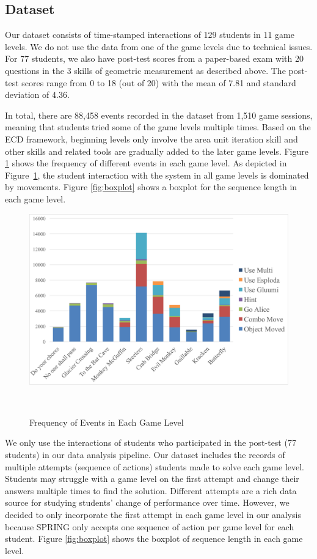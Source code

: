 \documentclass{sigchi}
\def\algname{SPRING\xspace}
\begin{document}
	\subsection{Dataset} 
	Our dataset consists of time-stamped interactions of 129 students in 11 game levels. 
	We do not use the data from one of the game levels due to technical issues.
	For 77 students, we also have post-test scores from a paper-based exam with 20 questions in the 3 skills of geometric measurement as described above.
	The post-test scores range from 0 to 18 (out of 20) with the mean of 7.81 and standard deviation of 4.36. 

	In total, there are 88,458 events recorded in the dataset from 1,510 game sessions, meaning that students tried some of the game levels  multiple times.
	Based on the ECD framework, beginning levels only involve the area unit iteration skill and other skills and related tools are gradually added to the later game levels.
	Figure \ref{fig:frequency} shows the frequency of different events in each game level. 
	As depicted in Figure~\ref{fig:frequency}, the student interaction with the system in all game levels is dominated by movements.
	Figure \ref{fig:boxplot} shows a boxplot for the sequence length in each game level. 

	
	\begin{figure}
		\centering
		\includegraphics[width=0.9\columnwidth]{figures/frequency.pdf}
		\caption{Frequency of Events in Each Game Level}~\label{fig:frequency}
	\end{figure}	
	

	We only use the interactions of students who participated in the post-test (77 students) in our data analysis pipeline.
	Our dataset includes the records of multiple attempts (sequence of actions) students made to solve each game level.
	Students may struggle with a game level on the first attempt and change their answers multiple times to find the solution.	
	Different attempts are a rich data source for studying students' change of performance over time.	
	However, we decided to  only incorporate the first attempt in each game level in our analysis because \algname only accepts one sequence of action per game level for each student.
	Figure \ref{fig:boxplot} shows the boxplot of sequence length in each game level. 
	\newline
\end{document}
